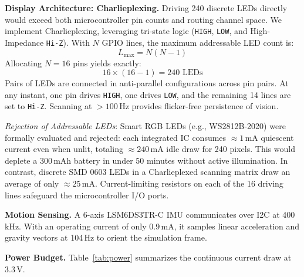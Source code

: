 \documentclass[conference]{IEEEtran}
\begin{document}
\textbf{Display Architecture: Charlieplexing.} Driving 240 discrete LEDs directly would exceed both microcontroller pin counts and routing channel space. We implement Charlieplexing, leveraging tri-state logic (\texttt{HIGH}, \texttt{LOW}, and High-Impedance \texttt{Hi-Z}). With $N$ GPIO lines, the maximum addressable LED count is:
\begin{equation}
    L_{\text{max}} = N(N - 1)
\end{equation}
Allocating $N = 16$ pins yields exactly:
\begin{equation}
    16 \times (16 - 1) = 240 \text{ LEDs}
\end{equation}
Pairs of LEDs are connected in anti-parallel configurations across pin pairs. At any instant, one pin drives \texttt{HIGH}, one drives \texttt{LOW}, and the remaining 14 lines are set to \texttt{Hi-Z}. Scanning at $>100$\,Hz provides flicker-free persistence of vision.

\emph{Rejection of Addressable LEDs}: Smart RGB LEDs (e.g., WS2812B-2020) were formally evaluated and rejected: each integrated IC consumes $\approx 1$\,mA quiescent current even when unlit, totaling $\approx 240$\,mA idle draw for 240 pixels. This would deplete a 300\,mAh battery in under 50 minutes without active illumination. In contrast, discrete SMD 0603 LEDs in a Charlieplexed scanning matrix draw an average of only $\approx 25$\,mA. Current-limiting resistors on each of the 16 driving lines safeguard the microcontroller I/O ports.

\textbf{Motion Sensing.} A 6-axis LSM6DS3TR-C IMU communicates over I2C at 400\,kHz. With an operating current of only 0.9\,mA, it samples linear acceleration and gravity vectors at 104\,Hz to orient the simulation frame.

\textbf{Power Budget.} Table~\ref{tab:power} summarizes the continuous current draw at 3.3\,V.
\begin{table}[htbp]
\caption{Estimated System Power Consumption}
\label{tab:power}
\centering
{}
\end{table}
\end{document}
